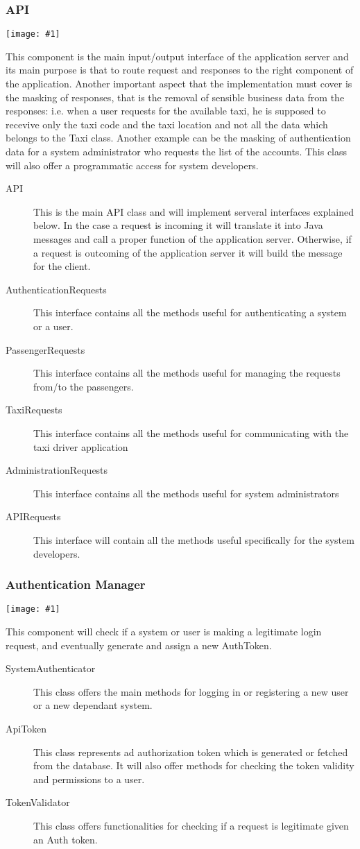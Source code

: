 \documentclass[11pt, a4paper,titlepage]{article}
\newcommand{\image}[1]{
	\begin{center}
		\noindent \texttt{[image: \#1]}
	\end{center}
	}
\begin{document}
 \subsubsection{API}
	 \image{diagram_class_api.png}
	 This component is the main input/output interface of the application server and its main purpose is that to route request and responses to the right component of the application. Another important aspect that the implementation must cover is the masking of responses, that is the removal of sensible business data from the responses: i.e. when a user requests for the available taxi, he is supposed to recevive only the taxi code and the taxi location and not all the data which belongs to the Taxi class. Another example can be the masking of authentication data for a system administrator who requests the list of the accounts.
	 \newline This class will also offer a programmatic access for system developers. 
	 \begin{description}
	 	\item[API] This is the main API class and will implement serveral interfaces explained below. In the case a request is incoming it will translate it into Java messages and call a proper function of the application server. Otherwise, if a request is outcoming of the application server it will build the message for the client.
	 	\item[AuthenticationRequests] This interface contains all the methods useful for authenticating a system or a user.
	 	\item[PassengerRequests] This interface contains all the methods useful for managing the requests from/to the passengers. 
	 	\item[TaxiRequests] This interface contains all the methods useful for communicating with the taxi driver application
	 	\item[AdministrationRequests] This interface contains all the methods useful for system administrators
	 	\item[APIRequests] This interface will contain all the methods useful specifically for the system developers.
	 \end{description}
	 \newpage
 \subsubsection{Authentication Manager}
	 \image{diagram_class_authentication.png}
	 This component will check if a system or user is making a legitimate login request, and eventually generate and assign a new AuthToken.
	 \begin{description}
	 	\item[SystemAuthenticator] This class offers the main methods for logging in or registering a new user or a new dependant system.
	 	\item[ApiToken] This class represents ad authorization token which is generated or fetched from the database. It will also offer methods for checking the token validity and permissions to a user.
	 	\item[TokenValidator] This class offers functionalities for checking if a request is legitimate given an Auth token.
	 \end{description}
	 \newpage
\end{document}
